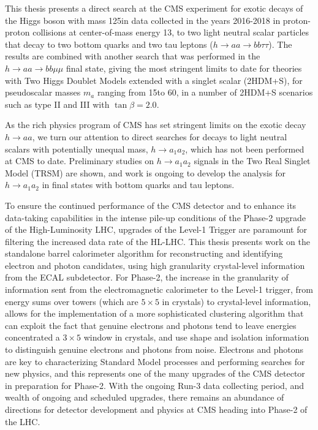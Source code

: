 This thesis presents a direct search at the CMS experiment for exotic decays of the Higgs boson with mass 125\GeV in data collected in the years 2016-2018 in proton-proton collisions at center-of-mass energy 13\TeV, to two light neutral scalar particles that decay to two bottom quarks and two tau leptons ($h \rightarrow aa \rightarrow bb\tau\tau$). The results are combined with another search that was performed in the $h \rightarrow aa \rightarrow bb\mu\mu$ final state, giving the most stringent limits to date for theories with Two Higgs Doublet Models extended with a singlet scalar (2HDM+S), for pseudoscalar masses $m_a$ ranging from 15\GeV to 60\GeV, in a number of 2HDM+S scenarios such as type II and III with $\tan\beta = 2.0$.

As the rich physics program of CMS has set stringent limits on the exotic decay $h \rightarrow aa$, we turn our attention to direct searches for decays to light neutral scalars with potentially unequal mass, $h \rightarrow a_1 a_2$, which has not been performed at CMS to date. Preliminary studies on $h \rightarrow a_1 a_2$ signals in the Two Real Singlet Model (TRSM) are shown, and work is ongoing to develop the analysis for $h \rightarrow a_1 a_2$ in final states with bottom quarks and tau leptons.

To ensure the continued performance of the CMS detector and to enhance its data-taking capabilities in the intense pile-up conditions of the Phase-2 upgrade of the High-Luminosity LHC, upgrades of the Level-1 Trigger are paramount for filtering the increased data rate of the HL-LHC. This thesis presents work on the standalone barrel calorimeter algorithm for reconstructing and identifying electron and photon candidates, using high granularity crystal-level information from the ECAL subdetector. For Phase-2, the increase in the granularity of information sent from the electromagnetic calorimeter to the Level-1 trigger, from energy sums over towers (which are $5\times 5$ in crystals) to crystal-level information, allows for the implementation of a more sophisticated clustering algorithm that can exploit the fact that genuine electrons and photons tend to leave energies concentrated a $3 \times 5$ window in crystals, and use shape and isolation information to distinguish genuine electrons and photons from noise. Electrons and photons are key to characterizing Standard Model processes and performing searches for new physics, and this represents one of the many upgrades of the CMS detector in preparation for Phase-2. With the ongoing Run-3 data collecting period, and wealth of ongoing and scheduled upgrades, there remains an abundance of directions for detector development and physics at CMS heading into Phase-2 of the LHC.